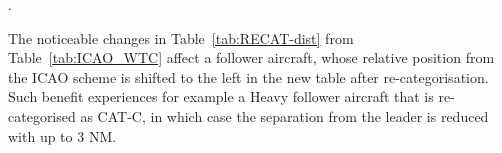 \begin{table}[h]
\centering
{}
\caption[Transition from ICAO WTC to RECAT-EU categories]{Transition from ICAO WTC to RECAT-EU categories. The categorisation process and criteria for assigning an existing aircraft type into RECAT-EU scheme is illustrated in detail in~\cite{rooseleer2015recat}}.
\label{tab:wtc2recat_division}
\end{table}

The noticeable changes in Table~\ref{tab:RECAT-dist} from Table~\ref{tab:ICAO_WTC} affect a follower aircraft, whose relative position from the ICAO scheme is shifted to the left in the new table after re-categorisation. Such benefit experiences for example a Heavy follower aircraft that is re-categorised as CAT-C, in which case the separation from the leader is reduced with up to 3 NM. 


